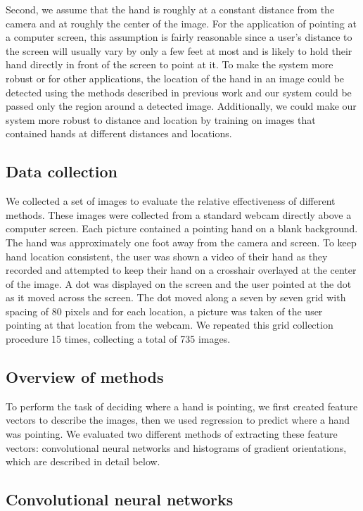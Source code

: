 \documentclass[10pt,twocolumn,letterpaper]{article}
\begin{document}
Second, we assume that the hand is roughly at a constant distance from the camera and at roughly the center of the image.  For the application of pointing at a computer screen, this assumption is fairly reasonable since a user's distance to the screen will usually vary by only a few feet at most and is likely to hold their hand directly in front of the screen to point at it.  To make the system more robust or for other applications, the location of the hand in an image could be detected using the methods described in previous work and our system could be passed only the region around a detected image.  Additionally, we could make our system more robust to distance and location by training on images that contained hands at different distances and locations.

\subsection{Data collection}

We collected a set of images to evaluate the relative effectiveness of different methods.  These images were collected from a standard webcam directly above a computer screen.  Each picture contained a pointing hand on a blank background.  The hand was approximately one foot away from the camera and screen.  To keep hand location consistent, the user was shown a video of their hand as they recorded and attempted to keep their hand on a crosshair overlayed at the center of the image.  A dot was displayed on the screen and the user pointed at the dot as it moved across the screen.  The dot moved along a seven by seven grid with spacing of 80 pixels and for each location, a picture was taken of the user pointing at that location from the webcam.  We repeated this grid collection procedure 15 times, collecting a total of 735 images.


\subsection{Overview of methods}

To perform the task of deciding where a hand is pointing, we first created feature vectors to describe the images, then we used regression to predict where a hand was pointing.  We evaluated two different methods of extracting these feature vectors: convolutional neural networks and histograms of gradient orientations, which are described in detail below.

\subsection{Convolutional neural networks}
\end{document}
